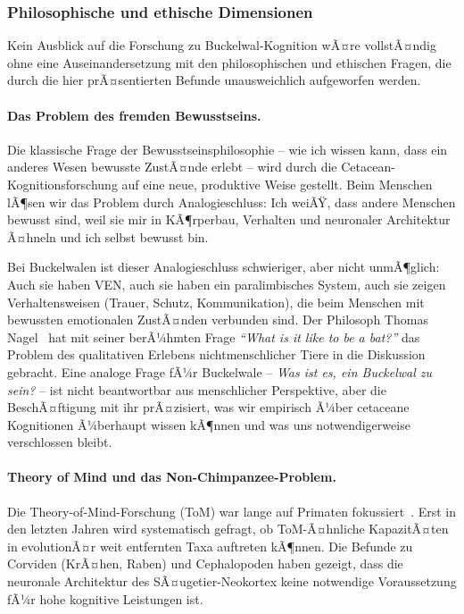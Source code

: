 ﻿\documentclass[12pt,a4paper]{article}
\theoremstyle{definition}
\theoremstyle{remark}
\begin{document}
\subsubsection{Philosophische und ethische Dimensionen}

Kein Ausblick auf die Forschung zu Buckelwal-Kognition wÃ¤re vollstÃ¤ndig ohne eine Auseinandersetzung mit den philosophischen und ethischen Fragen, die durch die hier prÃ¤sentierten Befunde unausweichlich aufgeworfen werden.

\paragraph{Das Problem des fremden Bewusstseins.}
Die klassische Frage der Bewusstseinsphilosophie -- wie ich wissen kann, dass ein anderes Wesen bewusste ZustÃ¤nde erlebt -- wird durch die Cetacean-Kognitionsforschung auf eine neue, produktive Weise gestellt. Beim Menschen lÃ¶sen wir das Problem durch Analogieschluss: Ich weiÃŸ, dass andere Menschen bewusst sind, weil sie mir in KÃ¶rperbau, Verhalten und neuronaler Architektur Ã¤hneln und ich selbst bewusst bin.

Bei Buckelwalen ist dieser Analogieschluss schwieriger, aber nicht unmÃ¶glich: Auch sie haben VEN, auch sie haben ein paralimbisches System, auch sie zeigen Verhaltensweisen (Trauer, Schutz, Kommunikation), die beim Menschen mit bewussten emotionalen ZustÃ¤nden verbunden sind. Der Philosoph Thomas Nagel~\cite{nagel1974bat} hat mit seiner berÃ¼hmten Frage \emph{``What is it like to be a bat?''} das Problem des qualitativen Erlebens nichtmenschlicher Tiere in die Diskussion gebracht. Eine analoge Frage fÃ¼r Buckelwale -- \emph{Was ist es, ein Buckelwal zu sein?} -- ist nicht beantwortbar aus menschlicher Perspektive, aber die BeschÃ¤ftigung mit ihr prÃ¤zisiert, was wir empirisch Ã¼ber cetaceane Kognitionen Ã¼berhaupt wissen kÃ¶nnen und was uns notwendigerweise verschlossen bleibt.

\paragraph{Theory of Mind und das Non-Chimpanzee-Problem.}
Die Theory-of-Mind-Forsch\-ung (ToM) war lange auf Primaten fokussiert~\cite{call2003chimpanzees, premack1978chimpanzee}. Erst in den letzten Jahren wird systematisch gefragt, ob ToM-Ã¤hnliche KapazitÃ¤ten in evolutionÃ¤r weit entfernten Taxa auftreten kÃ¶nnen. Die Befunde zu Corviden (KrÃ¤hen, Raben) und Cephalopoden haben gezeigt, dass die neuronale Architektur des SÃ¤ugetier-Neokortex keine notwendige Voraussetzung fÃ¼r hohe kognitive Leistungen ist.
\end{document}

